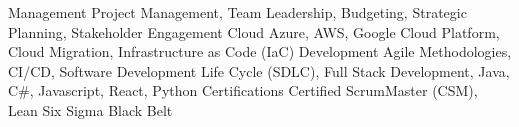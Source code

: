 
\begin{cvskills}
  \cvskill
  {Management} %
  {Project Management, Team Leadership, Budgeting, Strategic Planning, Stakeholder Engagement} %
  \cvskill
  {Cloud} %
  {Azure, AWS, Google Cloud Platform, Cloud Migration, Infrastructure as Code (IaC)} %
  \cvskill
  {Development} %
  {Agile Methodologies, CI/CD, Software Development Life Cycle (SDLC), Full Stack Development, Java, C\#, Javascript, React, Python} %
  \cvskill
  {Certifications} %
  {Certified ScrumMaster (CSM), Lean Six Sigma Black Belt} %
\end{cvskills}

